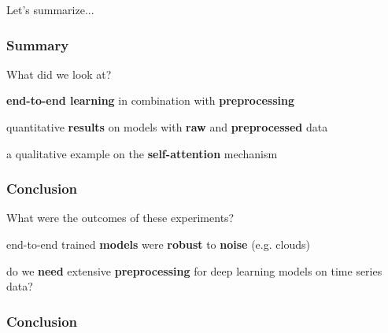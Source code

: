 \documentclass[%
  aspectratio=169,
  9pt,
  english,
  light,
  mathserif,
  professionalfont,
  affiliationintitlepagehead,
  titlegraphic,
   affiliation,
]{beamer}
\begin{document}
{


{
	\begin{frame}[plain]
	
	\vspace{8em}
	\begin{center}
		\Huge\color{white}
		Let's summarize...
	\end{center}\color{white}
	
\end{frame}
}

\begin{frame}
\frametitle{Summary}
\Large 

\begin{leftbubbles}
	What did we look at?
\end{leftbubbles}

\pause
\begin{rightbubbles}
	\textbf{end-to-end learning} in combination with \textbf{preprocessing}
\end{rightbubbles}

\pause
\begin{rightbubbles}
	quantitative \textbf{results} on models with \textbf{raw} and \textbf{preprocessed} data
\end{rightbubbles}

\pause
\begin{rightbubbles}
	a qualitative example on the \textbf{self-attention} mechanism
\end{rightbubbles}

\end{frame}

\begin{frame}
\frametitle{Conclusion}
\Large 

\begin{leftbubbles}
	What were the outcomes of these experiments?
\end{leftbubbles}

\pause
\begin{rightbubbles}
	{end-to-end} trained \textbf{models} were \textbf{robust} to \textbf{noise} {\small (e.g. clouds)}
\end{rightbubbles}

\pause
\begin{rightbubbles}
	do we \textbf{need} extensive \textbf{preprocessing} for deep learning models on time series data?
\end{rightbubbles}

\end{frame}
\frametitle{Conclusion}

}
\end{document}

